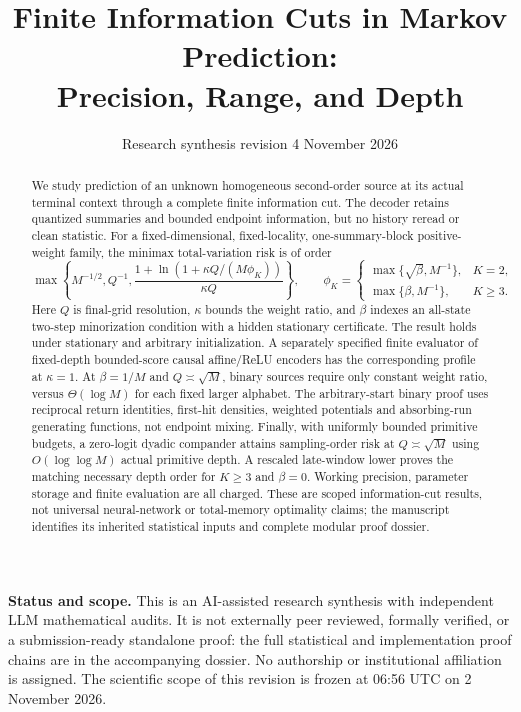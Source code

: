 \documentclass[11pt,letterpaper]{article}
\title{\vspace{-1.4em}Finite Information Cuts in Markov Prediction:\\Precision, Range, and Depth}
\author{}
\date{Research synthesis revision 4\quad 2 November 2026}
\theoremstyle{definition}\newtheorem{definition}[theorem]{Definition}
\theoremstyle{remark}\newtheorem{remark}[theorem]{Remark}
\begin{document}
\maketitle\vspace{-1.4em}
\begin{abstract}
We study prediction of an unknown homogeneous second-order source at its actual terminal context through a complete finite information cut. The decoder retains quantized summaries and bounded endpoint information, but no history reread or clean statistic. For a fixed-dimensional, fixed-locality, one-summary-block positive-weight family, the minimax total-variation risk is of order
\[
 \max\left\{M^{-1/2},Q^{-1},
 \frac{1+\ln(1+\kappa Q/(M\phi_K))}{\kappa Q}\right\},\qquad
 \phi_K=
 \begin{cases}
 \max\{\sqrt\beta,M^{-1}\},&K=2,\\
 \max\{\beta,M^{-1}\},&K\ge3.
 \end{cases}
\]
Here $Q$ is final-grid resolution, $\kappa$ bounds the weight ratio, and $\beta$ indexes an all-state two-step minorization condition with a hidden stationary certificate. The result holds under stationary and arbitrary initialization. A separately specified finite evaluator of fixed-depth bounded-score causal affine/ReLU encoders has the corresponding profile at $\kappa=1$. At $\beta=1/M$ and $Q\asymp\sqrt M$, binary sources require only constant weight ratio, versus $\Theta(\log M)$ for each fixed larger alphabet. The arbitrary-start binary proof uses reciprocal return identities, first-hit densities, weighted potentials and absorbing-run generating functions, not endpoint mixing. Finally, with uniformly bounded primitive budgets, a zero-logit dyadic compander attains sampling-order risk at $Q\asymp\sqrt M$ using $O(\log\log M)$ actual primitive depth. A rescaled late-window lower proves the matching necessary depth order for $K\ge3$ and $\beta=0$. Working precision, parameter storage and finite evaluation are all charged. These are scoped information-cut results, not universal neural-network or total-memory optimality claims; the manuscript identifies its inherited statistical inputs and complete modular proof dossier.
\end{abstract}
\noindent\textbf{Status and scope.} This is an AI-assisted research synthesis with independent LLM mathematical audits. It is not externally peer reviewed, formally verified, or a submission-ready standalone proof: the full statistical and implementation proof chains are in the accompanying dossier. No authorship or institutional affiliation is assigned. The scientific scope of this revision is frozen at 06:56 UTC on 2 November 2026.
\end{document}
